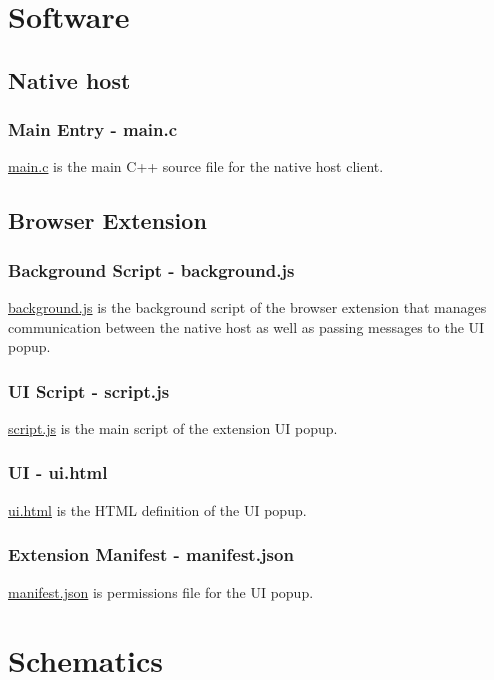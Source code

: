 \section{Software}
\subsection{Native host}
\subsubsection{Main Entry - main.c}
\label{sec:mainc}
\href{https://github.com/spacehen/EEE4022F/blob/main/Software/Nativehost/main.c}{main.c} is the main C++ source file for the native host client. 
\subsection{Browser Extension}
\label{sec:browser11}
\subsubsection{Background Script - background.js}
\label{sec:back}
\href{https://github.com/spacehen/EEE4022F/blob/main/Software/Browser\%20Extension/background.js}{background.js} is the background script of the browser extension that manages communication between the native host as well as passing messages to the UI popup.
\subsubsection{UI Script - script.js}
\href{https://github.com/spacehen/EEE4022F/blob/main/Software/Browser\%20Extension/script.js}{script.js} is the main script of the extension UI popup.
\subsubsection{UI - ui.html}
\href{https://github.com/spacehen/EEE4022F/blob/main/Software/Browser\%20Extension/ui.html}{ui.html} is the HTML definition of the UI popup.
\subsubsection{Extension Manifest - manifest.json}
\href{https://github.com/spacehen/EEE4022F/blob/main/Software/Browser\%20Extension/manifest.json}{manifest.json} is permissions file for the UI popup.

\section{Schematics}
